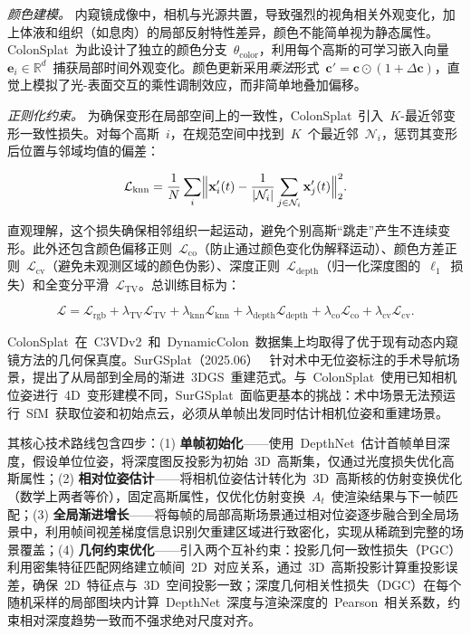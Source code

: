 \textit{颜色建模。}
内窥镜成像中，相机与光源共置，导致强烈的视角相关外观变化，加上体液和组织（如息肉）的局部反射特性差异，颜色不能简单视为静态属性。ColonSplat~为此设计了独立的颜色分支~$\theta_{\mathrm{color}}$，利用每个高斯的可学习嵌入向量~$\mathbf{e}_i \in \mathbb{R}^d$~捕获局部时间外观变化。颜色更新采用\emph{乘法}形式~$\mathbf{c}' = \mathbf{c} \odot (1 + \Delta\mathbf{c})$，直觉上模拟了光-表面交互的乘性调制效应，而非简单地叠加偏移。

\textit{正则化约束。}
为确保变形在局部空间上的一致性，ColonSplat~引入~$K$-最近邻变形一致性损失。对每个高斯~$i$，在规范空间中找到~$K$~个最近邻~$\mathcal{N}_i$，惩罚其变形后位置与邻域均值的偏差：

\begin{equation}
    \mathcal{L}_{\mathrm{knn}} = \frac{1}{N}\sum_i
    \Bigl\|\mathbf{x}'_i(t) - \frac{1}{|\mathcal{N}_i|}\sum_{j\in\mathcal{N}_i}\mathbf{x}'_j(t)\Bigr\|_2^2.
\end{equation}

直观理解，这个损失确保相邻组织一起运动，避免个别高斯``跳走''产生不连续变形。此外还包含颜色偏移正则~$\mathcal{L}_{\mathrm{co}}$（防止通过颜色变化伪解释运动）、颜色方差正则~$\mathcal{L}_{\mathrm{cv}}$（避免未观测区域的颜色伪影）、深度正则~$\mathcal{L}_{\mathrm{depth}}$（归一化深度图的~$\ell_1$~损失）和全变分平滑~$\mathcal{L}_{\mathrm{TV}}$。总训练目标为：

\begin{equation}
    \mathcal{L} = \mathcal{L}_{\mathrm{rgb}} + \lambda_{\mathrm{TV}}\mathcal{L}_{\mathrm{TV}}
    + \lambda_{\mathrm{knn}}\mathcal{L}_{\mathrm{knn}}
    + \lambda_{\mathrm{depth}}\mathcal{L}_{\mathrm{depth}}
    + \lambda_{\mathrm{co}}\mathcal{L}_{\mathrm{co}}
    + \lambda_{\mathrm{cv}}\mathcal{L}_{\mathrm{cv}}.
\end{equation}

ColonSplat~在~C3VDv2~和~DynamicColon~数据集上均取得了优于现有动态内窥镜方法的几何保真度。SurGSplat（2025.06）~\cite{2506_05935} 针对术中无位姿标注的手术导航场景，提出了从局部到全局的渐进~3DGS~重建范式。与~ColonSplat~使用已知相机位姿进行~4D~变形建模不同，SurGSplat~面临更基本的挑战：术中场景无法预运行~SfM~获取位姿和初始点云，必须从单帧出发同时估计相机位姿和重建场景。

其核心技术路线包含四步：(1) \textbf{单帧初始化}——使用~DepthNet~估计首帧单目深度，假设单位位姿，将深度图反投影为初始~3D~高斯集，仅通过光度损失优化高斯属性；(2) \textbf{相对位姿估计}——将相机位姿估计转化为~3D~高斯核的仿射变换优化（数学上两者等价），固定高斯属性，仅优化仿射变换~$A_t$~使渲染结果与下一帧匹配；(3) \textbf{全局渐进增长}——将每帧的局部高斯场景通过相对位姿逐步融合到全局场景中，利用帧间视差梯度信息识别欠重建区域进行致密化，实现从稀疏到完整的场景覆盖；(4) \textbf{几何约束优化}——引入两个互补约束：投影几何一致性损失（PGC）利用密集特征匹配网络建立帧间~2D~对应关系，通过~3D~高斯投影计算重投影误差，确保~2D~特征点与~3D~空间投影一致；深度几何相关性损失（DGC）在每个随机采样的局部图块内计算~DepthNet~深度与渲染深度的~Pearson~相关系数，约束相对深度趋势一致而不强求绝对尺度对齐。

